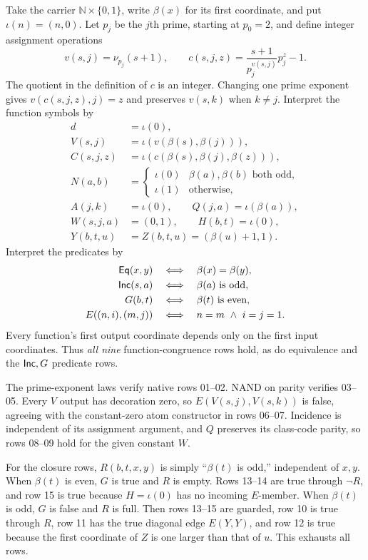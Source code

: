 Take the carrier $\mathbb N\times\{0,1\}$, write $\beta(x)$ for its first
coordinate, and put $\iota(n)=(n,0)$. Let $p_j$ be the $j$th prime,
starting at $p_0=2$, and define integer assignment operations
\[
v(s,j)=\nu_{p_j}(s+1),\qquad
c(s,j,z)=\frac{s+1}{p_j^{v(s,j)}}p_j^z-1.
\]
The quotient in the definition of $c$ is an integer. Changing one prime
exponent gives $v(c(s,j,z),j)=z$ and preserves $v(s,k)$ when $k\ne j$.
Interpret the function symbols by
\begin{align*}
d&=\iota(0),\\
V(s,j)&=\iota(v(\beta(s),\beta(j))),\\
C(s,j,z)&=\iota(c(\beta(s),\beta(j),\beta(z))),\\
N(a,b)&=\begin{cases}\iota(0)&\beta(a),\beta(b)\text{ both odd},\\
                         \iota(1)&\text{otherwise},\end{cases}\\
A(j,k)&=\iota(0),\qquad Q(j,a)=\iota(\beta(a)),\\
W(s,j,a)&=(0,1),\qquad H(b,t)=\iota(0),\\
Y(b,t,u)&=Z(b,t,u)=(\beta(u)+1,1).
\end{align*}
Interpret the predicates by
\begin{align*}
\mathsf{Eq}(x,y)&\quad\Longleftrightarrow\quad\beta(x)=\beta(y),\\
\mathsf{Inc}(s,a)&\quad\Longleftrightarrow\quad\beta(a)\text{ is odd},\\
G(b,t)&\quad\Longleftrightarrow\quad\beta(t)\text{ is even},\\
E((n,i),(m,j))&\quad\Longleftrightarrow\quad n=m\ \land\ i=j=1.
\end{align*}
Every function's first output coordinate depends only on the first input
coordinates. Thus \emph{all nine} function-congruence rows hold, as do
equivalence and the $\mathsf{Inc},G$ predicate rows.

The prime-exponent laws verify native rows 01--02. NAND on parity verifies
03--05. Every $V$ output has decoration zero, so $E(V(s,j),V(s,k))$ is
false, agreeing with the constant-zero atom constructor in rows 06--07.
Incidence is independent of its assignment argument, and $Q$ preserves
its class-code parity, so rows 08--09 hold for the given constant $W$.

For the closure rows, $R(b,t,x,y)$ is simply ``$\beta(t)$ is odd,'' independent
of $x,y$. When $\beta(t)$ is even, $G$ is true and $R$ is empty. Rows 13--14
are true through $\neg R$, and row 15 is true because $H=\iota(0)$ has
no incoming $E$-member. When $\beta(t)$ is odd, $G$ is false and $R$ is full.
Then rows 13--15 are guarded, row 10 is true through $R$, row 11 has the
true diagonal edge $E(Y,Y)$, and row 12 is true because the first
coordinate of $Z$ is one larger than that of $u$. This exhausts all rows.

